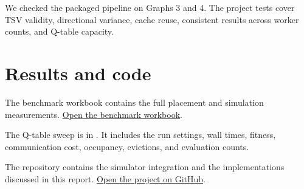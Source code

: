 \documentclass[12pt,a4paper]{article}
\begin{document}
We checked the packaged pipeline on Graphs 3 and 4. The project tests cover TSV validity, directional variance, cache reuse, consistent results across worker counts, and Q-table capacity.

\section{Results and code}

The benchmark workbook contains the full placement and simulation measurements. \href{https://docs.google.com/spreadsheets/d/13I29-_UOsBwOk56806ZpmFxmFg6YCexZC1dRvwPh1W8/edit?gid=0#gid=0}{Open the benchmark workbook}.

The Q-table sweep is in . It includes the run settings, wall times, fitness, communication cost, occupancy, evictions, and evaluation counts.

The repository contains the simulator integration and the implementations discussed in this report. \href{https://github.com/RagavKrishnaRamesh/3.5D-NOC-Simulator-Code}{Open the project on GitHub}.
\end{document}
